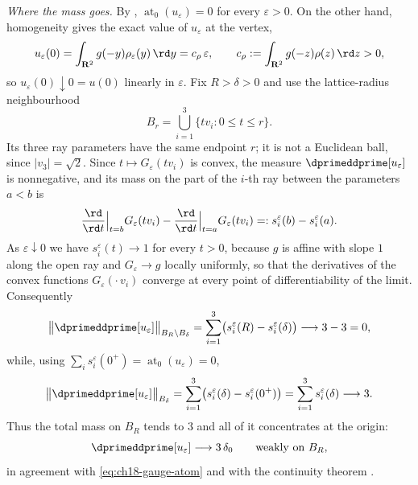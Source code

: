 \begin{example}
\emph{Where the mass goes.}  By ,
$\operatorname{at}_0(u_\varepsilon)=0$ for every $\varepsilon>0$.  On the
other hand, homogeneity gives the exact value of $u_\varepsilon$ at the
vertex,
\begin{equation}
\label{eq:ch18-gauge-vertex-value}
 u_\varepsilon(0)=\int_{\mathbf R^2}g(-y)\rho_\varepsilon(y)\,\rd y
 =c_\rho\,\varepsilon,
 \qquad
 c_\rho:=\int_{\mathbf R^2}g(-z)\rho(z)\,\rd z>0 ,
\end{equation}
so $u_\varepsilon(0)\downarrow0=u(0)$ linearly in $\varepsilon$.  Fix
$R>\delta>0$ and use the lattice-radius neighbourhood
\[
 B_r=\bigcup_{i=1}^3\{tv_i:0\leq t\leq r\}.
\]
Its three ray parameters have the same endpoint $r$; it is not a Euclidean
ball, since $|v_3|=\sqrt2$.  Since $t\mapsto
G_\varepsilon(tv_i)$ is convex, the measure $\dprimeddprime[u_\varepsilon]$
is nonnegative, and its mass on the part of the $i$-th ray between the
parameters $a<b$ is
\[
 \frac{\rd}{\rd t}\Big|_{t=b}G_\varepsilon(tv_i)
 -\frac{\rd}{\rd t}\Big|_{t=a}G_\varepsilon(tv_i)
 =:s_i^\varepsilon(b)-s_i^\varepsilon(a).
\]
As $\varepsilon\downarrow0$ we have $s_i^\varepsilon(t)\to1$ for every
$t>0$, because $g$ is affine with slope $1$ along the open ray and
$G_\varepsilon\to g$ locally uniformly, so that the derivatives of the
convex functions $G_\varepsilon(\cdot\,v_i)$ converge at every point of
differentiability of the limit.  Consequently
\[
 \bigl\|\dprimeddprime[u_\varepsilon]\bigr\|_{B_R\setminus B_\delta}
 =\sum_{i=1}^3\bigl(s_i^\varepsilon(R)-s_i^\varepsilon(\delta)\bigr)
 \longrightarrow 3-3=0,
\]
while, using $\sum_is_i^\varepsilon(0^+)=\operatorname{at}_0(u_\varepsilon)=0$,
\[
 \bigl\|\dprimeddprime[u_\varepsilon]\bigr\|_{B_\delta}
 =\sum_{i=1}^3\bigl(s_i^\varepsilon(\delta)-s_i^\varepsilon(0^+)\bigr)
 =\sum_{i=1}^3s_i^\varepsilon(\delta)
 \longrightarrow 3 .
\]
Thus the total mass on $B_R$ tends to $3$ and all of it concentrates at the
origin:
\begin{equation}
\label{eq:ch18-gauge-concentration}
 \dprimeddprime[u_\varepsilon]\longrightarrow 3\,\delta_0
 \qquad\text{weakly on }B_R,
\end{equation}
in agreement with \eqref{eq:ch18-gauge-atom} and with the continuity theorem
.
\end{example}

